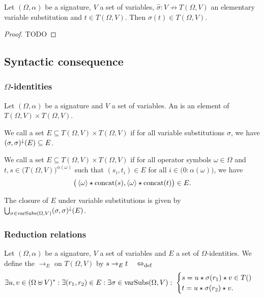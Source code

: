 \begin{lemma}
Let $(\Omega, \alpha)$ be a signature, $V$ a set of variables, $\hat{\sigma}: V\not\to T(\Omega, V)$ an elementary variable substitution and $t\in T(\Omega, V)$. Then $\sigma(t) \in T(\Omega, V)$. 
\end{lemma}
\begin{proof}
TODO
\end{proof}

\subsection{Syntactic consequence}
\subsubsection[Omega-identities]{$\Omega$-identities}
\begin{definition}
Let $(\Omega, \alpha)$ be a signature and $V$ a set of variables. An  is an element of $T(\Omega, V)\times T(\Omega, V)$.

We call a set $E\subseteq T(\Omega, V)\times T(\Omega, V)$  if for all variable substitutions $\sigma$, we have $(\sigma, \sigma)^\downarrow(E) \subseteq E$.

We call a set $E\subseteq T(\Omega, V)\times T(\Omega, V)$  if for all operator symbols $\omega\in\Omega$ and $t,s\in \big(T(\Omega, V)\big)^{\alpha(\omega)}$ such that $(s_i, t_i)\in E$ for all $i\in \big(0:\alpha(\omega)\big)$, we have
\[ \big( \left\langle \omega \right\rangle\star \operatorname{concat}(s), \left\langle \omega \right\rangle\star \operatorname{concat}(t)\big) \in E. \]
\end{definition}

The closure of $E$ under variable substitutions is given by $\bigcup_{\sigma\in\operatorname{varSubs}(\Omega, V)}(\sigma, \sigma)^\downarrow(E)$.

\subsubsection{Reduction relations}
\begin{definition}
Let $(\Omega, \alpha)$ be a signature, $V$ a set of variables and $E$ a set of $\Omega$-identities. We define the  $\to_E$ on $T(\Omega, V)$ by $s\to_E t \quad\Leftrightarrow_{\text{def}}\quad$
\[ \exists u,v\in (\Omega\uplus V)^*: \exists (r_1, r_2)\in E: \exists \sigma\in \operatorname{varSubs}(\Omega, V):\; \begin{cases}
s = u \star \sigma(r_1) \star v \in T() \\
t = u \star \sigma(r_2) \star v.
\end{cases}  \]
\end{definition}

